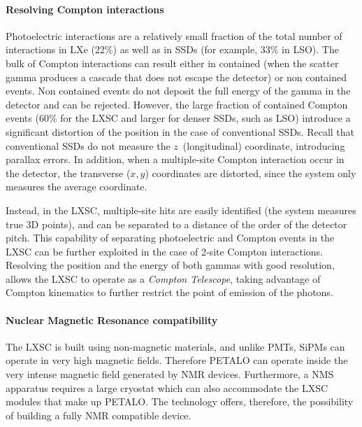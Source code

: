 \paragraph{Resolving Compton interactions}
Photoelectric interactions are a relatively small fraction of the total number of interactions in LXe (22\%) as well as in SSDs (for example, 33\% in LSO). The bulk of Compton interactions can result either in contained (when the scatter gamma produces a cascade that does not escape the detector) or non contained events. Non contained events do not deposit the full energy of the gamma in the detector and can be rejected. However, the large fraction of contained Compton events (60\% for the LXSC and larger for denser SSDs, such as LSO) introduce a significant distortion of the position in the case of conventional SSDs. Recall that conventional SSDs do not measure the $z$~(longitudinal) coordinate, introducing parallax errors. In addition, when a multiple-site Compton interaction occur in the detector, the transverse ($x,y$) coordinates are distorted, since the system only measures the average coordinate. 

Instead, in the LXSC, multiple-site hits are easily identified (the system measures true 3D points), and can be separated to a distance of the order of the detector pitch. This capability of separating photoelectric and Compton events in the LXSC can be further exploited in the case of 2-site Compton interactions. Resolving the position and the energy of both gammas with good resolution, allows the LXSC to operate as a {\em Compton Telescope}, taking advantage of Compton kinematics to further restrict the point of emission of the photons. 

\paragraph{Nuclear Magnetic Resonance compatibility}

The LXSC  is built using non-magnetic materials, and unlike PMTs, SiPMs can operate in very high magnetic fields. Therefore PETALO can operate inside the very intense magnetic field generated by NMR devices. Furthermore, a NMS apparatus requires a large cryostat which can also accommodate the LXSC modules that make up PETALO. The technology offers, therefore, the possibility of building a fully NMR compatible device.  

